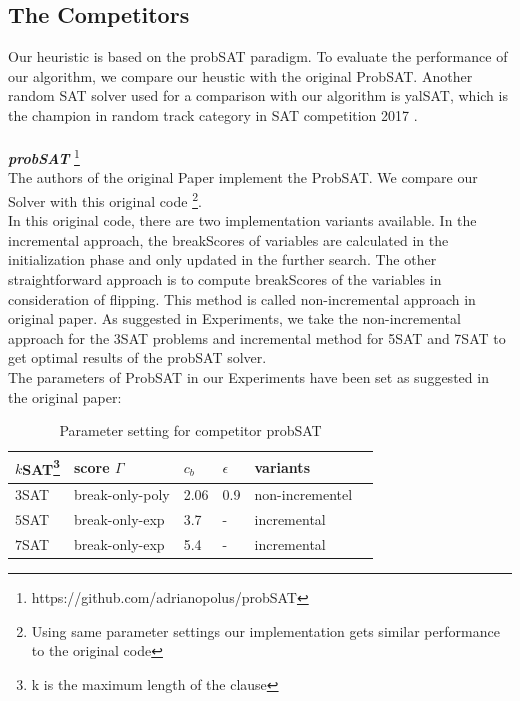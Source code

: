 \documentclass[12pt,a4paper,twoside]{scrartcl}
\numberwithin{equation}{section}
\begin{document}
\subsection{The Competitors}
\label{comparision}
Our heuristic is based on the probSAT paradigm. To evaluate the performance of our algorithm, we compare our heustic with the original ProbSAT. Another random SAT solver used for a comparison with our algorithm is yalSAT, which is the champion in random track category in SAT competition 2017 \cite{biere2014yet}.\\
\\
\emph{\textbf{probSAT}} \footnote{https://github.com/adrianopolus/probSAT}
\\
The authors of the original Paper implement the ProbSAT. We compare our Solver with this original code \footnote{Using same parameter settings our implementation gets similar performance to the original code}.  \\
In this original code, there are two implementation variants available. In the incremental approach, the breakScores of variables are calculated in the initialization phase and only updated in the further search. The other straightforward approach is to compute breakScores of the variables in consideration of flipping. This method is called non-incremental approach in original paper. As suggested in Experiments, we take the non-incremental approach for the 3SAT problems and incremental method for 5SAT and 7SAT to get optimal results of the probSAT solver.\\
The parameters of ProbSAT in our Experiments have been set as suggested in the original paper:\\
\begin{table}[h!]
\begin{center}
    \begin{tabular}{| l | l| l | l| l |p{3cm}|}
\hline 
    $k$SAT\footnote{k is the maximum length of the clause} & score $\Gamma$ & $c_b$ & $\epsilon$ &variants \\ \hline
    $3$SAT & break-only-poly& 2.06 & 0.9 &non-incrementel \\ \hline
    $5$SAT & break-only-exp & 3.7 & - & incremental \\ \hline
    $7$SAT &  break-only-exp & 5.4 & - & incremental \\ \hline
\end{tabular}
\caption[probSAT]{Parameter setting for competitor probSAT}
\end{center}
\end{table} 
\end{document}

